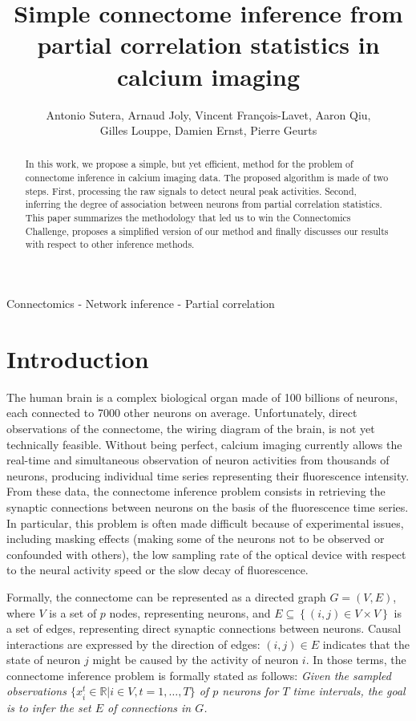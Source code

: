 \documentclass[wcp]{jmlr}
\title{Simple connectome inference from partial correlation statistics in calcium imaging}
\author{Antonio Sutera,
        Arnaud Joly,
        Vincent François-Lavet,
        Aaron Qiu, \\
        Gilles Louppe,
        Damien Ernst,
        Pierre Geurts}
\begin{document}
\maketitle

\begin{abstract} In this work, we propose a simple, but yet efficient, method for the problem of connectome inference in
calcium imaging data. The proposed algorithm is made of two steps. First,
processing the raw signals to detect neural peak activities. Second, inferring
the degree of association between neurons from partial correlation statistics.
This paper summarizes the methodology that led us to win the Connectomics
Challenge, proposes a simplified version of our method and finally discusses
our results with respect to other inference methods.\end{abstract}

\begin{keywords}
Connectomics - Network inference - Partial correlation
\end{keywords}


\section{Introduction}\label{sec:intro}

The human brain is a complex biological
organ made of 100 billions of neurons, each connected to 7000 other neurons on
average. Unfortunately, direct observations of the connectome, the wiring
diagram of the brain, is not yet technically feasible. Without being perfect,
calcium imaging currently allows the real-time and simultaneous observation of
neuron activities from thousands of neurons, producing individual time series
representing their fluorescence intensity. From these data, the connectome
inference problem consists in retrieving the synaptic connections between
neurons on the basis of the fluorescence time series. In particular, this
problem is often made difficult because of experimental issues, including
masking effects (making some of the neurons not to be observed or confounded
with others), the low sampling rate of the optical device with respect to the
neural activity speed or the slow decay of fluorescence.

Formally, the connectome can be represented as a directed graph $G=(V,E)$,
where $V$ is a set of $p$ nodes, representing neurons, and $E \subseteq
\left\{(i, j) \in V \times V\right\}$ is a set of edges, representing direct
synaptic connections between neurons. Causal interactions are expressed by the
direction of edges: $(i, j) \in E$ indicates that the state of neuron $j$ might
be caused by the activity of neuron $i$. In those terms,  the connectome
inference problem is formally stated as follows:  \textit{Given the sampled
observations $\{ x^t_i \in \mathbb{R} | i \in V, t = 1, \dots, T \}$ of $p$
neurons for $T$ time intervals, the goal is to infer the set $E$ of connections in $G$.}
\end{document}
